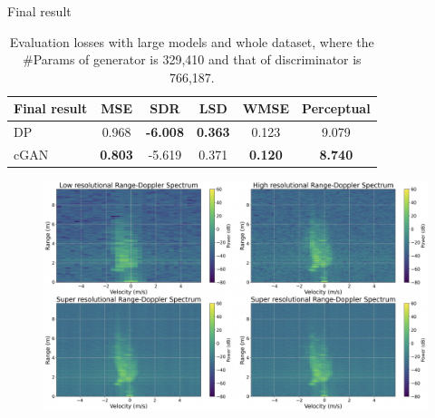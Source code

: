 \documentclass{beamer}
\begin{document}
\begin{frame}{Final result}
    \vspace{-0.8\baselineskip}
    \begin{table}
        \centering
        \caption{Evaluation losses with large models and whole dataset, where the \#Params of generator is 329,410 and that of discriminator is 766,187.}
        \label{Evaluation losses with large models and whole dataset}
        \vspace{-0.2cm}
        \begin{tabular}{l|c|c|c|c|c}
            \hline
            Final result & MSE & SDR & LSD & WMSE & Perceptual \\
            \hline
            DP & 0.968 & \textbf{-6.008} & \textbf{0.363} & 0.123 & 9.079 \\
            \hline
            cGAN & \textbf{0.803} & -5.619 & 0.371 & \textbf{0.120} & \textbf{8.740} \\
            \hline
        \end{tabular}
    \end{table}
    \vspace{-0.2\baselineskip}
    \begin{figure}
        \centering
        \includegraphics[scale=.21]{MA_presentation/figures/evaluation_large_new.png}

\end{figure}
\end{frame}
\end{document}
